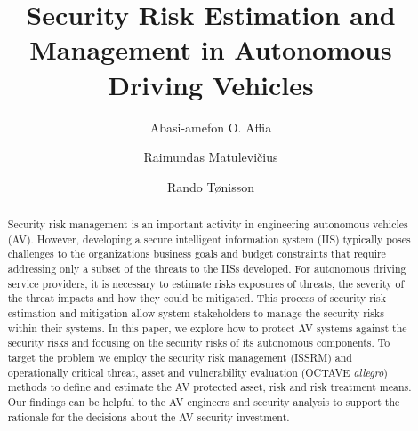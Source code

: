 \documentclass[runningheads]{llncs}
\begin{document}
%
\title{Security Risk Estimation and Management in Autonomous Driving Vehicles}
%
%
\author{Abasi-amefon O. Affia \and Raimundas Matulevi\v{c}ius \and Rando T\o{}nisson}

%
%
%
\maketitle              %
%

\begin{abstract}
Security risk management is an important activity in engineering autonomous vehicles (AV). However, developing a secure intelligent information system (IIS) typically poses challenges to the  organizations business goals and budget constraints that require addressing only a subset of the threats to the IISs developed.
For autonomous driving service providers, it is necessary to estimate risks exposures of threats, the severity of the threat impacts and how they could be mitigated. This process of security risk estimation and mitigation allow system stakeholders to manage the security risks within their systems. %
In this paper, we explore how to protect AV systems against the security risks and focusing on the security risks of its autonomous components. To target the problem we employ the security risk management (ISSRM) and operationally critical threat, asset and vulnerability evaluation (OCTAVE \textit{allegro})  methods to define and estimate the AV protected asset, risk and risk treatment means.
%
Our findings can be helpful to the AV engineers and security analysis to support the rationale for the decisions about the AV security investment. 

\end{abstract}
\end{document}
